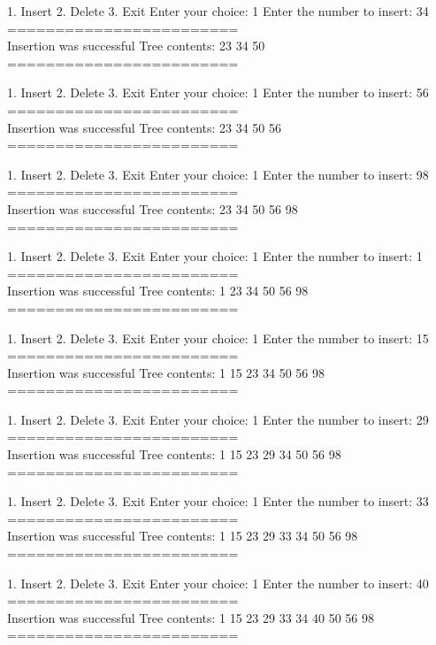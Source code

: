 \documentclass[]{jsarticle}
\begin{document}
1. Insert
2. Delete
3. Exit
Enter your choice: 1
Enter the number to insert: 34\\
========================\\
Insertion was successful
Tree contents: 23 34 50 \\
========================

1. Insert
2. Delete
3. Exit
Enter your choice: 1
Enter the number to insert: 56\\
========================\\
Insertion was successful
Tree contents: 23 34 50 56 \\
========================

1. Insert
2. Delete
3. Exit
Enter your choice: 1
Enter the number to insert: 98\\
========================\\
Insertion was successful
Tree contents: 23 34 50 56 98 \\
========================

1. Insert
2. Delete
3. Exit
Enter your choice: 1
Enter the number to insert: 1\\
========================\\
Insertion was successful
Tree contents: 1 23 34 50 56 98 \\
========================

1. Insert
2. Delete
3. Exit
Enter your choice: 1
Enter the number to insert: 15\\
========================\\
Insertion was successful
Tree contents: 1 15 23 34 50 56 98 \\
========================

1. Insert
2. Delete
3. Exit
Enter your choice: 1
Enter the number to insert: 29\\
========================\\
Insertion was successful
Tree contents: 1 15 23 29 34 50 56 98 \\
========================

1. Insert
2. Delete
3. Exit
Enter your choice: 1
Enter the number to insert: 33\\
========================\\
Insertion was successful
Tree contents: 1 15 23 29 33 34 50 56 98 \\
========================

1. Insert
2. Delete
3. Exit
Enter your choice: 1
Enter the number to insert: 40\\
========================\\
Insertion was successful
Tree contents: 1 15 23 29 33 34 40 50 56 98 \\
========================
\vspace*{3\baselineskip}
\end{document}
